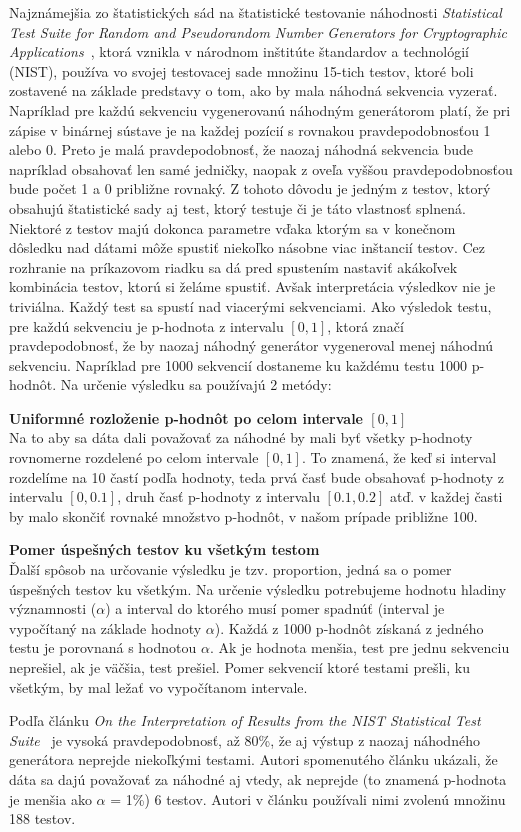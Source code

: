 Najznámejšia zo štatistických sád na štatistické testovanie náhodnosti \textit{Statistical Test Suite for Random and Pseudorandom Number Generators for Cryptographic Applications}~\parencite{nist-sts-documentation}, ktorá vznikla v národnom inštitúte štandardov a technológií (NIST), používa vo svojej testovacej sade množinu 15-tich testov, ktoré boli zostavené na základe predstavy o tom, ako by mala náhodná sekvencia vyzerať. Napríklad pre každú sekvenciu vygenerovanú náhodným generátorom platí, že pri zápise v binárnej sústave je na každej pozícií s rovnakou pravdepodobnosťou 1 alebo 0. Preto je malá pravdepodobnosť, že naozaj náhodná sekvencia bude napríklad obsahovať len samé jedničky, naopak z oveľa vyššou pravdepodobnosťou bude počet 1 a 0 približne rovnaký. Z tohoto dôvodu je jedným z testov, ktorý obsahujú štatistické sady aj test, ktorý testuje či je táto vlastnosť splnená. Niektoré z testov majú dokonca parametre vďaka ktorým sa v konečnom dôsledku nad dátami môže spustiť niekoľko násobne viac inštancií testov. Cez rozhranie na príkazovom riadku sa dá pred spustením nastaviť akákoľvek kombinácia testov, ktorú si želáme spustiť. Avšak interpretácia výsledkov nie je triviálna. Každý test sa spustí nad viacerými sekvenciami. Ako výsledok testu, pre každú sekvenciu je p-hodnota z intervalu $[0, 1]$, ktorá značí pravdepodobnosť, že by naozaj náhodný generátor vygeneroval menej náhodnú sekvenciu. Napríklad pre 1000 sekvencií dostaneme ku každému testu 1000 p-hodnôt. Na určenie výsledku sa používajú 2 metódy:
\begin{myItemize}
	\item \textbf{Uniformné rozloženie p-hodnôt po celom intervale $[0, 1]$}\\Na to aby sa dáta dali považovať za náhodné by mali byť všetky p-hodnoty rovnomerne rozdelené po celom intervale $[0, 1]$. To znamená, že keď si interval rozdelíme na 10 častí podľa hodnoty, teda prvá časť bude obsahovať p-hodnoty z intervalu $[0, 0.1]$, druh časť p-hodnoty z intervalu $[0.1, 0.2]$ atď. v každej časti by malo skončiť rovnaké množstvo p-hodnôt, v našom prípade približne 100.
	\item \textbf{Pomer úspešných testov ku všetkým testom}\\Ďalší spôsob na určovanie výsledku je tzv. proportion, jedná sa o pomer úspešných testov ku všetkým. Na určenie výsledku potrebujeme hodnotu hladiny významnosti ($\alpha$) a interval do ktorého musí pomer spadnúť (interval je vypočítaný na základe hodnoty $\alpha$). Každá z 1000 p-hodnôt získaná z jedného testu je porovnaná s hodnotou $\alpha$. Ak je hodnota menšia, test pre jednu sekvenciu neprešiel, ak je väčšia, test prešiel. Pomer sekvencií ktoré testami prešli, ku všetkým, by mal ležať vo vypočítanom intervale.
\end{myItemize}
Podľa článku \textit{On the Interpretation of Results from the NIST Statistical Test Suite}~\parencite{nist-sts-interpretation-syso} je vysoká pravdepodobnosť, až 80\%, že aj výstup z naozaj náhodného generátora neprejde niekoľkými testami. Autori spomenutého článku ukázali, že dáta sa dajú považovať za náhodné aj vtedy, ak neprejde (to znamená p-hodnota je menšia ako $\alpha$ = 1\%) 6 testov. Autori v článku používali nimi zvolenú množinu 188 testov.

